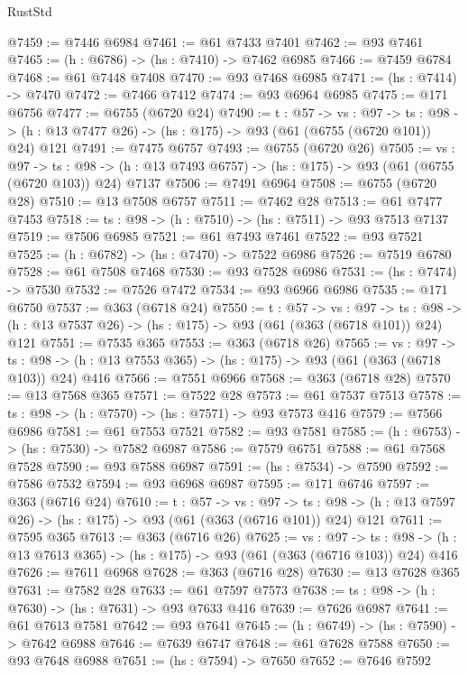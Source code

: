 \begin{lexlean}{RustStd}
\begin{coremodule}
@7459 := @7446 @6984
@7461 := @61 @7433 @7401
@7462 := @93 @7461
@7465 := (h : @6786) -> (hs : @7410) -> @7462 @6985
@7466 := @7459 @6784
@7468 := @61 @7448 @7408
@7470 := @93 @7468 @6985
@7471 := (hs : @7414) -> @7470
@7472 := @7466 @7412
@7474 := @93 @6964 @6985
@7475 := @171 @6756
@7477 := @6755 (@6720 @24)
@7490 := {t : @57} ->
  {vs : @97} ->
  {ts : @98} -> (h : @13 @7477 @26) -> (hs : @175) -> @93 (@61 (@6755 (@6720 @101)) @24) @121
@7491 := @7475 @6757
@7493 := @6755 (@6720 @26)
@7505 := {vs : @97} ->
  {ts : @98} -> (h : @13 @7493 @6757) -> (hs : @175) -> @93 (@61 (@6755 (@6720 @103)) @24) @7137
@7506 := @7491 @6964
@7508 := @6755 (@6720 @28)
@7510 := @13 @7508 @6757
@7511 := @7462 @28
@7513 := @61 @7477 @7453
@7518 := {ts : @98} -> (h : @7510) -> (hs : @7511) -> @93 @7513 @7137
@7519 := @7506 @6985
@7521 := @61 @7493 @7461
@7522 := @93 @7521
@7525 := (h : @6782) -> (hs : @7470) -> @7522 @6986
@7526 := @7519 @6780
@7528 := @61 @7508 @7468
@7530 := @93 @7528 @6986
@7531 := (hs : @7474) -> @7530
@7532 := @7526 @7472
@7534 := @93 @6966 @6986
@7535 := @171 @6750
@7537 := @363 (@6718 @24)
@7550 := {t : @57} ->
  {vs : @97} ->
  {ts : @98} -> (h : @13 @7537 @26) -> (hs : @175) -> @93 (@61 (@363 (@6718 @101)) @24) @121
@7551 := @7535 @365
@7553 := @363 (@6718 @26)
@7565 := {vs : @97} ->
  {ts : @98} -> (h : @13 @7553 @365) -> (hs : @175) -> @93 (@61 (@363 (@6718 @103)) @24) @416
@7566 := @7551 @6966
@7568 := @363 (@6718 @28)
@7570 := @13 @7568 @365
@7571 := @7522 @28
@7573 := @61 @7537 @7513
@7578 := {ts : @98} -> (h : @7570) -> (hs : @7571) -> @93 @7573 @416
@7579 := @7566 @6986
@7581 := @61 @7553 @7521
@7582 := @93 @7581
@7585 := (h : @6753) -> (hs : @7530) -> @7582 @6987
@7586 := @7579 @6751
@7588 := @61 @7568 @7528
@7590 := @93 @7588 @6987
@7591 := (hs : @7534) -> @7590
@7592 := @7586 @7532
@7594 := @93 @6968 @6987
@7595 := @171 @6746
@7597 := @363 (@6716 @24)
@7610 := {t : @57} ->
  {vs : @97} ->
  {ts : @98} -> (h : @13 @7597 @26) -> (hs : @175) -> @93 (@61 (@363 (@6716 @101)) @24) @121
@7611 := @7595 @365
@7613 := @363 (@6716 @26)
@7625 := {vs : @97} ->
  {ts : @98} -> (h : @13 @7613 @365) -> (hs : @175) -> @93 (@61 (@363 (@6716 @103)) @24) @416
@7626 := @7611 @6968
@7628 := @363 (@6716 @28)
@7630 := @13 @7628 @365
@7631 := @7582 @28
@7633 := @61 @7597 @7573
@7638 := {ts : @98} -> (h : @7630) -> (hs : @7631) -> @93 @7633 @416
@7639 := @7626 @6987
@7641 := @61 @7613 @7581
@7642 := @93 @7641
@7645 := (h : @6749) -> (hs : @7590) -> @7642 @6988
@7646 := @7639 @6747
@7648 := @61 @7628 @7588
@7650 := @93 @7648 @6988
@7651 := (hs : @7594) -> @7650
@7652 := @7646 @7592

\end{coremodule}
\end{lexlean}
